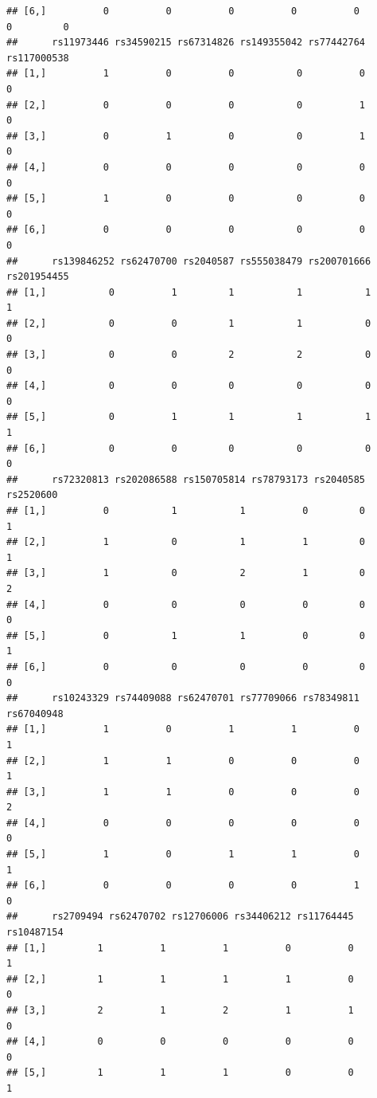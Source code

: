 \documentclass[
]{article}
\begin{document}
\begin{verbatim}
## [6,]          0          0          0          0          0         0         0
##      rs11973446 rs34590215 rs67314826 rs149355042 rs77442764 rs117000538
## [1,]          1          0          0           0          0           0
## [2,]          0          0          0           0          1           0
## [3,]          0          1          0           0          1           0
## [4,]          0          0          0           0          0           0
## [5,]          1          0          0           0          0           0
## [6,]          0          0          0           0          0           0
##      rs139846252 rs62470700 rs2040587 rs555038479 rs200701666 rs201954455
## [1,]           0          1         1           1           1           1
## [2,]           0          0         1           1           0           0
## [3,]           0          0         2           2           0           0
## [4,]           0          0         0           0           0           0
## [5,]           0          1         1           1           1           1
## [6,]           0          0         0           0           0           0
##      rs72320813 rs202086588 rs150705814 rs78793173 rs2040585 rs2520600
## [1,]          0           1           1          0         0         1
## [2,]          1           0           1          1         0         1
## [3,]          1           0           2          1         0         2
## [4,]          0           0           0          0         0         0
## [5,]          0           1           1          0         0         1
## [6,]          0           0           0          0         0         0
##      rs10243329 rs74409088 rs62470701 rs77709066 rs78349811 rs67040948
## [1,]          1          0          1          1          0          1
## [2,]          1          1          0          0          0          1
## [3,]          1          1          0          0          0          2
## [4,]          0          0          0          0          0          0
## [5,]          1          0          1          1          0          1
## [6,]          0          0          0          0          1          0
##      rs2709494 rs62470702 rs12706006 rs34406212 rs11764445 rs10487154
## [1,]         1          1          1          0          0          1
## [2,]         1          1          1          1          0          0
## [3,]         2          1          2          1          1          0
## [4,]         0          0          0          0          0          0
## [5,]         1          1          1          0          0          1

\end{verbatim}
\end{document}
